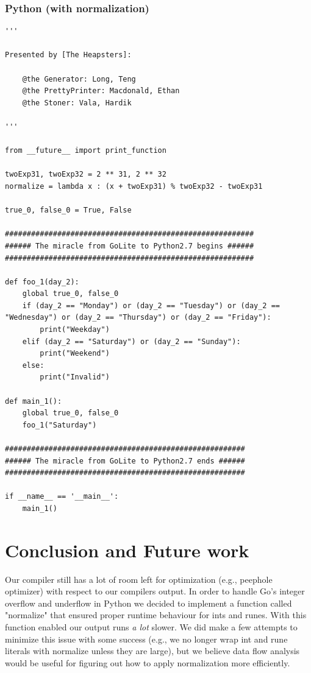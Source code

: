 \documentclass{article}
\begin{document}
\subsubsection{Python (with normalization)}
\begin{lstlisting}
'''

Presented by [The Heapsters]:

	@the Generator: Long, Teng
	@the PrettyPrinter: Macdonald, Ethan
	@the Stoner: Vala, Hardik

'''

from __future__ import print_function

twoExp31, twoExp32 = 2 ** 31, 2 ** 32
normalize = lambda x : (x + twoExp31) % twoExp32 - twoExp31

true_0, false_0 = True, False

#########################################################
###### The miracle from GoLite to Python2.7 begins ######
#########################################################

def foo_1(day_2):
	global true_0, false_0
	if (day_2 == "Monday") or (day_2 == "Tuesday") or (day_2 == "Wednesday") or (day_2 == "Thursday") or (day_2 == "Friday"):
		print("Weekday")
	elif (day_2 == "Saturday") or (day_2 == "Sunday"):
		print("Weekend")
	else:
		print("Invalid")

def main_1():
	global true_0, false_0
	foo_1("Saturday")

#######################################################
###### The miracle from GoLite to Python2.7 ends ######
#######################################################

if __name__ == '__main__':
	main_1()
\end{lstlisting}

\section{Conclusion and Future work}

Our compiler still has a lot of room left for optimization (e.g., peephole optimizer) with respect to our compilers output. In order to handle Go's integer overflow and underflow in Python we decided to implement a function called "normalize" that ensured proper runtime behaviour for ints and runes. With this function enabled our output runs \textit{a lot} slower. We did make a few attempts to minimize this issue with some success (e.g., we no longer wrap int and rune literals with normalize unless they are large), but we believe data flow analysis would be useful for figuring out how to apply normalization more efficiently.
\end{document}
